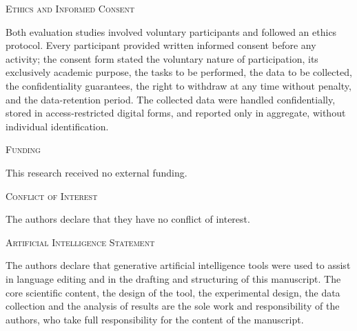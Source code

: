 \documentclass[10pt,journal,twoside,letterpaper]{IEEEtran}
\newcommand{\seccionfunding}[1]{%
	\vspace{0.6em}
	\noindent\textsc{Funding}
	\par\vspace{0.2em}
	\small #1
	\par
}
\newcommand{\seccionconflicto}[1]{%
	\vspace{0.6em}
	\noindent\textsc{Conflict of Interest}
	\par\vspace{0.2em}
	\small #1
	\par
}
\newcommand{\seccioniadeclaracion}[1]{%
	\vspace{0.6em}
	\noindent\textsc{Artificial Intelligence Statement}
	\par\vspace{0.2em}
	\small #1
	\par
}
\newcommand{\seccionetica}[1]{%
	\vspace{0.6em}
	\noindent\textsc{Ethics and Informed Consent}
	\par\vspace{0.2em}
	\small #1
	\par
}
\begin{document}
	\seccionetica{%
		Both evaluation studies involved voluntary participants and followed an ethics protocol. Every participant provided written informed consent before any activity; the consent form stated the voluntary nature of participation, its exclusively academic purpose, the tasks to be performed, the data to be collected, the confidentiality guarantees, the right to withdraw at any time without penalty, and the data-retention period. The collected data were handled confidentially, stored in access-restricted digital forms, and reported only in aggregate, without individual identification.
	}

	\seccionfunding{%
		This research received no external funding.
	}

	\seccionconflicto{%
		The authors declare that they have no conflict of interest.
	}

	\seccioniadeclaracion{%
		The authors declare that generative artificial intelligence tools were used to assist in language editing and in the drafting and structuring of this manuscript. The core scientific content, the design of the tool, the experimental design, the data collection and the analysis of results are the sole work and responsibility of the authors, who take full responsibility for the content of the manuscript.
	}

	
	
\end{document}
